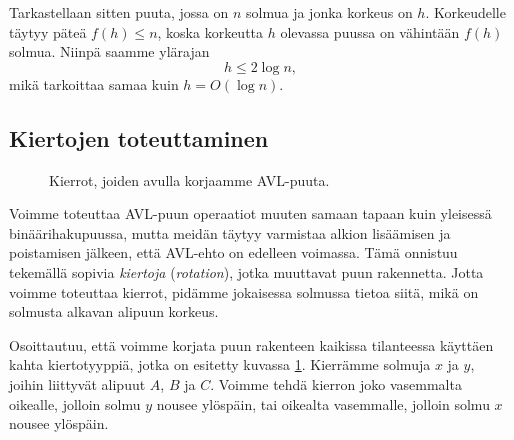 Tarkastellaan sitten puuta, jossa on $n$ solmua
ja jonka korkeus on $h$.
Korkeudelle täytyy päteä $f(h) \le n$,
koska korkeutta $h$ olevassa puussa on vähintään $f(h)$ solmua.
Niinpä saamme ylärajan
\[h \le 2 \log n,\]
mikä tarkoittaa samaa kuin $h = O(\log n)$.

\subsection{Kiertojen toteuttaminen}

\begin{figure}
\center
{}
\caption{Kierrot, joiden avulla korjaamme AVL-puuta.}
\label{fig:avlkie}
\end{figure}


Voimme toteuttaa AVL-puun operaatiot muuten samaan tapaan
kuin yleisessä binäärihakupuussa, mutta meidän täytyy varmistaa
alkion lisäämisen ja poistamisen jälkeen, että AVL-ehto
on edelleen voimassa.
Tämä onnistuu tekemällä sopivia \emph{kiertoja} (\emph{rotation}),
jotka muuttavat puun rakennetta.
Jotta voimme toteuttaa kierrot, pidämme jokaisessa
solmussa tietoa siitä, mikä on solmusta alkavan alipuun korkeus.

Osoittautuu, että voimme korjata puun rakenteen kaikissa
tilanteessa käyttäen kahta kiertotyyppiä,
jotka on esitetty kuvassa \ref{fig:avlkie}.
Kierrämme solmuja $x$ ja $y$,
joihin liittyvät alipuut $A$, $B$ ja $C$.
Voimme tehdä kierron joko vasemmalta oikealle,
jolloin solmu $y$ nousee ylöspäin,
tai oikealta vasemmalle,
jolloin solmu $x$ nousee ylöspäin.

